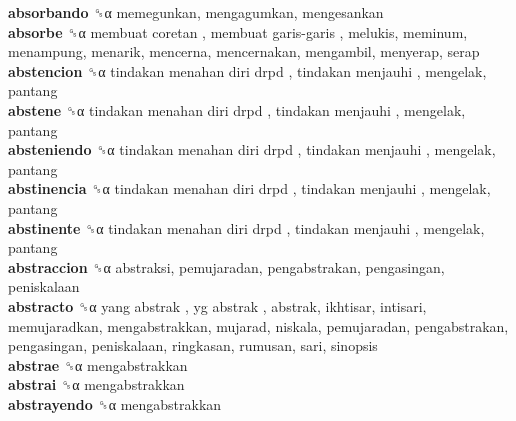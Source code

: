 \textbf{absorbando} ␝α  memegunkan, mengagumkan, mengesankan  \\
\textbf{absorbe} ␝α   membuat coretan ,  membuat garis-garis , melukis, meminum, menampung, menarik, mencerna, mencernakan, mengambil, menyerap, serap  \\
\textbf{abstencion} ␝α   tindakan menahan diri drpd ,  tindakan menjauhi , mengelak, pantang  \\
\textbf{abstene} ␝α   tindakan menahan diri drpd ,  tindakan menjauhi , mengelak, pantang  \\
\textbf{absteniendo} ␝α   tindakan menahan diri drpd ,  tindakan menjauhi , mengelak, pantang  \\
\textbf{abstinencia} ␝α   tindakan menahan diri drpd ,  tindakan menjauhi , mengelak, pantang  \\
\textbf{abstinente} ␝α   tindakan menahan diri drpd ,  tindakan menjauhi , mengelak, pantang  \\
\textbf{abstraccion} ␝α  abstraksi, pemujaradan, pengabstrakan, pengasingan, peniskalaan  \\
\textbf{abstracto} ␝α   yang abstrak ,  yg abstrak , abstrak, ikhtisar, intisari, memujaradkan, mengabstrakkan, mujarad, niskala, pemujaradan, pengabstrakan, pengasingan, peniskalaan, ringkasan, rumusan, sari, sinopsis  \\
\textbf{abstrae} ␝α  mengabstrakkan  \\
\textbf{abstrai} ␝α  mengabstrakkan  \\
\textbf{abstrayendo} ␝α  mengabstrakkan  \\
